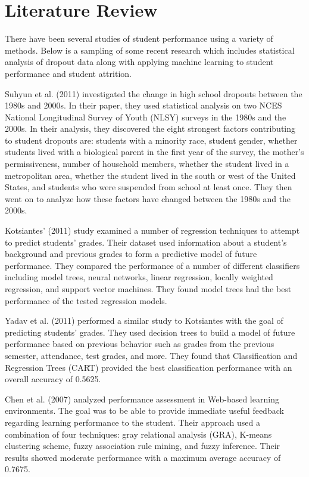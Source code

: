\documentclass[twoside,11pt]{article}
\begin{document}
\section{Literature Review}

There have been several studies of student performance using a variety of
methods.  Below is a sampling of some recent research which includes
statistical analysis of dropout data along with applying machine learning to
student performance and student attrition.

Suhyun et al. (2011) \nocite{Suhyun:2011} investigated the change in high
school dropouts between the 1980s and 2000s.  In their paper, they used
statistical analysis on two NCES National Longitudinal Survey of Youth (NLSY)
surveys in the 1980s and the 2000s.  In their analysis, they discovered the
eight strongest factors contributing to student dropouts are: students with a
minority race, student gender, whether students lived with a biological parent
in the first year of the survey, the mother's permissiveness, number of
household members, whether the student lived in a metropolitan area, whether
the student lived in the south or west of the United States, and students who
were suspended from school at least once.  They then went on to analyze how
these factors have changed between the 1980s and the 2000s.

Kotsiantes' (2011) \nocite{Kotsiantis:2011} study examined a number of
regression techniques to attempt to predict students' grades.  Their dataset
used information about a student's background and previous grades to form a
predictive model of future performance.  They compared the performance of a
number of different classifiers including model trees, neural networks, linear
regression, locally weighted regression, and support vector machines.  They
found model trees had the best performance of the tested regression models.

Yadav et al. (2011) \nocite{Yadav:2011} performed a similar study to Kotsiantes
with the goal of predicting students' grades.  They used decision trees to
build a model of future performance based on previous behavior such as grades
from the previous semester, attendance, test grades, and more.  They found that
Classification and Regression Trees (CART) provided the best classification
performance with an overall accuracy of 0.5625.

Chen et al. (2007) \nocite{Chen:2007} analyzed performance assessment in
Web-based learning environments.  The goal was to be able to provide immediate
useful feedback regarding learning performance to the student.  Their approach
used a combination of four techniques: gray relational analysis (GRA), K-means
clustering scheme, fuzzy association rule mining, and fuzzy inference.  Their
results showed moderate performance with a maximum average accuracy of 0.7675.
\end{document}
